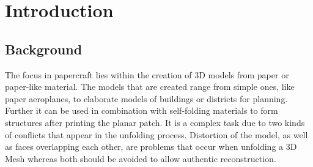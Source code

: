 \documentclass[draft,final]{vutinfth} %
\begin{document}
\frontmatter %

\addstatementpage

\begin{danksagung*}
\end{danksagung*}

\begin{acknowledgements*}
\end{acknowledgements*}

\begin{kurzfassung}
\end{kurzfassung}

\begin{abstract}
\end{abstract}


\tableofcontents %

\mainmatter

\chapter{Introduction}

\section{Background}

The focus in papercraft lies within the creation of 3D models from paper or paper-like material. The models that are created range from simple ones, like paper aeroplanes, to elaborate models of buildings or districts for planning. Further it can be used in combination with self-folding materials to form structures after printing the planar patch. It is a complex task due to two kinds of conflicts that appear in the unfolding process. Distortion of the model, as well as faces overlapping each other, are problems that occur when unfolding a 3D Mesh whereas both should be avoided to allow authentic reconstruction.
\end{document}
